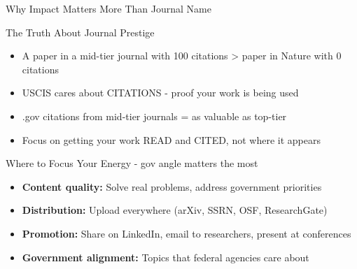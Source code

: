 \documentclass[11pt]{beamer}
\begin{document}
	\begin{frame}{Why Impact Matters More Than Journal Name}
		\scriptsize
		\begin{block}{The Truth About Journal Prestige}
			\begin{itemize}
				\item A paper in a mid-tier journal with 100 citations > paper in Nature with 0 citations
				\item USCIS cares about CITATIONS - proof your work is being used
				\item .gov citations from mid-tier journals = as valuable as top-tier
				\item Focus on getting your work READ and CITED, not where it appears
			\end{itemize}
		\end{block}
		\begin{block}{Where to Focus Your Energy - gov angle matters the most}
			\begin{itemize}
				\item \textbf{Content quality:} Solve real problems, address government priorities
				\item \textbf{Distribution:} Upload everywhere (arXiv, SSRN, OSF, ResearchGate)
				\item \textbf{Promotion:} Share on LinkedIn, email to researchers, present at conferences
				\item \textbf{Government alignment:} Topics that federal agencies care about
			\end{itemize}
		\end{block}
	\end{frame}
	
\end{document}
